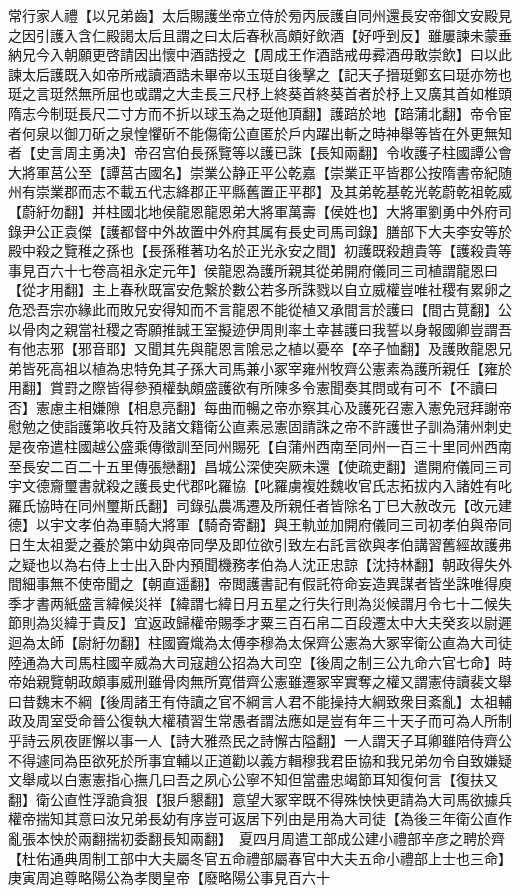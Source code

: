 常行家人禮【以兄弟齒】太后賜護坐帝立侍於㫄丙辰護自同州還長安帝御文安殿見之因引護入含仁殿謁太后且謂之曰太后春秋高頗好飲酒【好呼到反】雖屢諫未蒙垂納兄今入朝願更啓請因出懷中酒誥授之【周成王作酒誥戒毋彛酒毋敢崇飲】曰以此諫太后護既入如帝所戒讀酒誥未畢帝以玉珽自後擊之【記天子搢珽鄭玄曰珽亦笏也珽之言珽然無所屈也或謂之大圭長三尺杼上終葵首終葵首者於杼上又廣其首如椎頭隋志今制珽長尺二寸方而不折以球玉為之珽他頂翻】護踣於地【踣蒲北翻】帝令宦者何泉以御刀斫之泉惶懼斫不能傷衛公直匿於戶内躍出斬之時神舉等皆在外更無知者【史言周主勇决】帝召宫伯長孫覽等以護已誅【長知兩翻】令收護子柱國譚公會大將軍莒公至【譚莒古國名】崇業公静正平公乾嘉【崇業正平皆郡公按隋書帝紀随州有崇業郡而志不載五代志絳郡正平縣舊置正平郡】及其弟乾基乾光乾蔚乾祖乾威【蔚紆勿翻】并柱國北地侯龍恩龍恩弟大將軍萬壽【侯姓也】大將軍劉勇中外府司錄尹公正袁傑【護都督中外故置中外府其属有長史司馬司錄】膳部下大夫李安等於殿中殺之覽稚之孫也【長孫稚著功名於正光永安之間】初護既殺趙貴等【護殺貴等事見百六十七卷高祖永定元年】侯龍恩為護所親其從弟開府儀同三司植謂龍恩曰【從才用翻】主上春秋既富安危繋於數公若多所誅戮以自立威權豈唯社稷有累卵之危恐吾宗亦緣此而敗兄安得知而不言龍恩不能從植又承間言於護曰【間古莧翻】公以骨肉之親當社稷之寄願推誠王室擬迹伊周則率土幸甚護曰我誓以身報國卿豈謂吾有他志邪【邪音耶】又聞其先與龍恩言隂忌之植以憂卒【卒子恤翻】及護敗龍恩兄弟皆死高祖以植為忠特免其子孫大司馬兼小冢宰雍州牧齊公憲素為護所親任【雍於用翻】賞罸之際皆得參預權埶頗盛護欲有所陳多令憲聞奏其問或有可不【不讀曰否】憲慮主相嫌隙【相息亮翻】每曲而暢之帝亦察其心及護死召憲入憲免冠拜謝帝慰勉之使詣護第收兵符及諸文籍衛公直素忌憲固請誅之帝不許護世子訓為蒲州刺史是夜帝遣柱國越公盛乘傳徵訓至同州賜死【自蒲州西南至同州一百三十里同州西南至長安二百二十五里傳張戀翻】昌城公深使突厥未還【使疏吏翻】遣開府儀同三司宇文德齎璽書就殺之護長史代郡叱羅協【叱羅虜複姓魏收官氏志拓拔内入諸姓有叱羅氏協時在同州璽斯氏翻】司錄弘農馮遷及所親任者皆除名丁巳大赦改元【改元建德】以宇文孝伯為車騎大將軍【騎奇寄翻】與王軌並加開府儀同三司初孝伯與帝同日生太祖愛之養於第中幼與帝同學及即位欲引致左右託言欲與孝伯講習舊經故護弗之疑也以為右侍上士出入卧内預聞機務孝伯為人沈正忠諒【沈持林翻】朝政得失外間細事無不使帝聞之【朝直遥翻】帝閲護書記有假託符命妄造異謀者皆坐誅唯得庾季才書两紙盛言緯候災祥【緯謂七緯日月五星之行失行則為災候謂月令七十二候失節則為災緯于貴反】宜返政歸權帝賜季才粟三百石帛二百段遷太中大夫癸亥以尉遲迴為太師【尉紆勿翻】柱國竇熾為太傅李穆為太保齊公憲為大冢宰衛公直為大司徒陸通為大司馬柱國辛威為大司寇趙公招為大司空【後周之制三公九命六官七命】時帝始親覽朝政頗事威刑雖骨肉無所寛借齊公憲雖遷冢宰實奪之權又謂憲侍讀裴文舉曰昔魏末不綱【後周諸王有侍讀之官不綱言人君不能操持大綱致衆目紊亂】太祖輔政及周室受命晉公復執大權積習生常愚者謂法應如是豈有年三十天子而可為人所制乎詩云夙夜匪懈以事一人【詩大雅烝民之詩懈古隘翻】一人謂天子耳卿雖陪侍齊公不得遽同為臣欲死於所事宜輔以正道勸以義方輯穆我君臣協和我兄弟勿令自致嫌疑文舉咸以白憲憲指心撫几曰吾之夙心公寧不知但當盡忠竭節耳知復何言【復扶又翻】衛公直性浮詭貪狠【狠戶懇翻】意望大冢宰既不得殊怏怏更請為大司馬欲據兵權帝揣知其意曰汝兄弟長幼有序豈可返居下列由是用為大司徒【為後三年衛公直作亂張本怏於兩翻揣初委翻長知兩翻】　夏四月周遣工部成公建小禮部辛彦之聘於齊【杜佑通典周制工部中大夫屬冬官五命禮部屬春官中大夫五命小禮部上士也三命】　庚寅周追尊略陽公為孝閔皇帝【廢略陽公事見百六十
